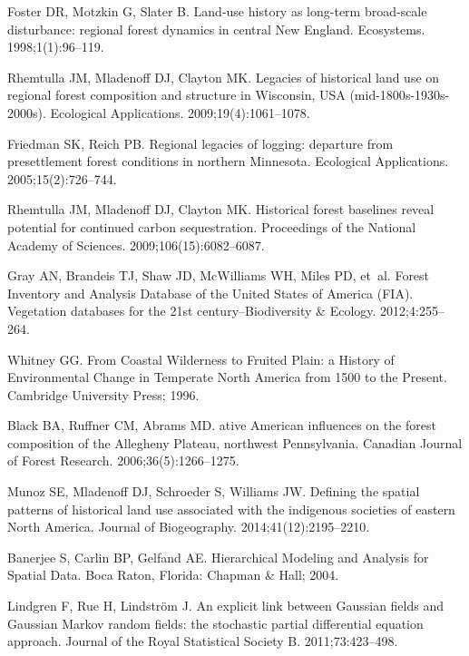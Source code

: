 \documentclass[10pt,letterpaper]{article}
\begin{document}
\begin{thebibliography}{10}
Foster DR, Motzkin G, Slater B.
\newblock Land-use history as long-term broad-scale disturbance: regional
  forest dynamics in central {N}ew {England}.
\newblock Ecosystems. 1998;1(1):96--119.

Rhemtulla JM, Mladenoff DJ, Clayton MK.
\newblock Legacies of historical land use on regional forest composition and
  structure in {W}isconsin, {USA} (mid-1800{s}-1930{s}-2000{s}).
\newblock Ecological Applications. 2009;19(4):1061--1078.

Friedman SK, Reich PB.
\newblock Regional legacies of logging: departure from presettlement forest
  conditions in northern {M}innesota.
\newblock Ecological Applications. 2005;15(2):726--744.

Rhemtulla JM, Mladenoff DJ, Clayton MK.
\newblock Historical forest baselines reveal potential for continued carbon
  sequestration.
\newblock Proceedings of the National Academy of Sciences.
  2009;106(15):6082--6087.

Gray AN, Brandeis TJ, Shaw JD, McWilliams WH, Miles PD, et~al.
\newblock Forest Inventory and Analysis Database of the {United States} of
  {America} ({FIA}).
\newblock Vegetation databases for the 21st century--Biodiversity \& Ecology.
  2012;4:255--264.

Whitney GG.
\newblock From Coastal Wilderness to Fruited Plain: a History of Environmental
  Change in Temperate {N}orth {A}merica from 1500 to the Present.
\newblock Cambridge University Press; 1996.

Black BA, Ruffner CM, Abrams MD.
ative {A}merican influences on the forest composition of the
  {A}llegheny {P}lateau, northwest {P}ennsylvania.
\newblock Canadian Journal of Forest Research. 2006;36(5):1266--1275.

Munoz SE, Mladenoff DJ, Schroeder S, Williams JW.
\newblock Defining the spatial patterns of historical land use associated with
  the indigenous societies of eastern {N}orth {A}merica.
\newblock Journal of Biogeography. 2014;41(12):2195--2210.

Banerjee S, Carlin BP, Gelfand AE.
\newblock Hierarchical Modeling and Analysis for Spatial Data.
\newblock Boca Raton, Florida: Chapman \& Hall; 2004.

Lindgren F, Rue H, Lindstr{\"o}m J.
\newblock An explicit link between {G}aussian fields and {G}aussian {M}arkov
  random fields: the stochastic partial differential equation approach.
\newblock Journal of the Royal Statistical Society B. 2011;73:423--498.


\end{thebibliography}
\end{document}

